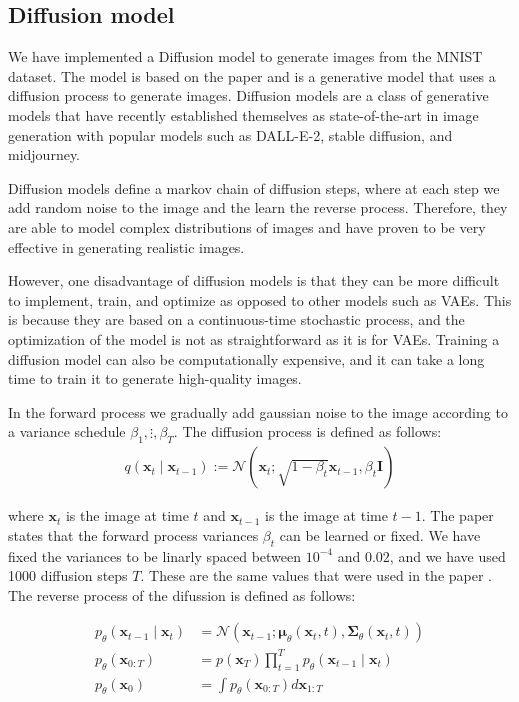 \subsection*{Diffusion model}

We have implemented a Diffusion model to generate images from the MNIST dataset. The model is based on the paper \cite{diffusion} and is a generative model that uses a diffusion process to generate images. Diffusion models are a class of generative models that have recently established themselves as state-of-the-art in image generation with popular models such as DALL-E-2, stable diffusion, and midjourney.

Diffusion models define a markov chain of diffusion steps, where at each step we add random noise to the image and the learn the reverse process. Therefore, they are able to model complex distributions of images and have proven to be very effective in generating realistic images.

However, one disadvantage of diffusion models is that they can be more difficult to implement, train, and optimize as opposed to other models such as VAEs. This is because they are based on a continuous-time stochastic process, and the optimization of the model is not as straightforward as it is for VAEs. Training a diffusion model can also be computationally expensive, and it can take a long time to train it to generate high-quality images.

In the forward process we gradually add gaussian noise to the image according to a variance schedule $\beta_1, \vdots, \beta_T$. The diffusion process is defined as follows:
\begin{align*}
    q\left(\mathbf{x}_t \mid \mathbf{x}_{t-1}\right):=\mathcal{N}\left(\mathbf{x}_t ; \sqrt{1-\beta_t} \mathbf{x}_{t-1}, \beta_t \mathbf{I}\right)
\end{align*}

where $\mathbf{x}_t$ is the image at time $t$ and $\mathbf{x}_{t-1}$ is the image at time $t-1$. The paper \cite{diffusion} states that the forward process variances $\beta_t$ can be learned or fixed. We have fixed the variances to be linarly spaced between $10^{-4}$ and $0.02$, and we have used 1000 diffusion steps $T$. These are the same values that were used in the paper \cite{diffusion}. The reverse process of the difussion is defined as follows:

\begin{align*}
    p_\theta\left(\mathbf{x}_{t-1} \mid \mathbf{x}_t\right)&=\mathcal{N}\left(\mathbf{x}_{t-1} ; \boldsymbol{\mu}_\theta\left(\mathbf{x}_t, t\right), \boldsymbol{\Sigma}_\theta\left(\mathbf{x}_t, t\right)\right)\\
    p_\theta\left(\mathbf{x}_{0: T}\right)&=p\left(\mathbf{x}_T\right) \prod_{t=1}^T p_\theta\left(\mathbf{x}_{t-1} \mid \mathbf{x}_t\right)\\
    p_\theta\left(\mathbf{x}_0\right) &=\int p_\theta\left(\mathbf{x}_{0: T}\right) d \mathbf{x}_{1: T}
\end{align*}

